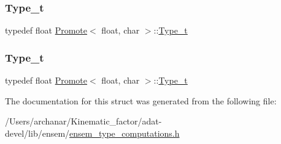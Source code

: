 \subsubsection{\texorpdfstring{Type\_t}{Type\_t}\hspace{0.1cm}{\footnotesize\ttfamily [2/3]}}
{\footnotesize\ttfamily typedef float \mbox{\hyperlink{structPromote}{Promote}}$<$ float, char $>$\+::\mbox{\hyperlink{structPromote_3_01float_00_01char_01_4_a9eacd1e5cdca40ea6e663825796599fc}{Type\+\_\+t}}}

\mbox{\label{structPromote_3_01float_00_01char_01_4_a9eacd1e5cdca40ea6e663825796599fc}} 
\subsubsection{\texorpdfstring{Type\_t}{Type\_t}\hspace{0.1cm}{\footnotesize\ttfamily [3/3]}}
{\footnotesize\ttfamily typedef float \mbox{\hyperlink{structPromote}{Promote}}$<$ float, char $>$\+::\mbox{\hyperlink{structPromote_3_01float_00_01char_01_4_a9eacd1e5cdca40ea6e663825796599fc}{Type\+\_\+t}}}



The documentation for this struct was generated from the following file\+:\begin{DoxyCompactItemize}
\item 
/\+Users/archanar/\+Kinematic\+\_\+factor/adat-\/devel/lib/ensem/\mbox{\hyperlink{adat-devel_2lib_2ensem_2ensem__type__computations_8h}{ensem\+\_\+type\+\_\+computations.\+h}}\end{DoxyCompactItemize}
